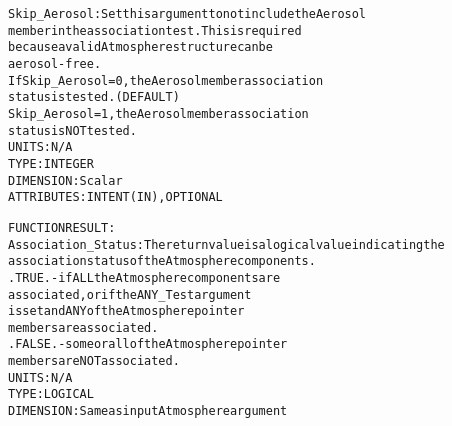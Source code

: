 \begin{alltt}
        Skip_Aerosol:        Set this argument to not include the Aerosol
                             member in the association test. This is required
                             because a valid Atmosphere structure can be
                             aerosol-free.
                             If Skip_Aerosol = 0, the Aerosol member association
                                                  status is tested.  (DEFAULT)
                                Skip_Aerosol = 1, the Aerosol member association
                                                  status is NOT tested.
                             UNITS:      N/A
                             TYPE:       INTEGER
                             DIMENSION:  Scalar
                             ATTRIBUTES: INTENT(IN), OPTIONAL
 
  FUNCTION RESULT:
        Association_Status:  The return value is a logical value indicating the
                             association status of the Atmosphere components.
                             .TRUE.  - if ALL the Atmosphere components are
                                       associated, or if the ANY_Test argument
                                       is set and ANY of the Atmosphere pointer
                                       members are associated.
                             .FALSE. - some or all of the Atmosphere pointer
                                       members are NOT associated.
                             UNITS:      N/A
                             TYPE:       LOGICAL
                             DIMENSION:  Same as input Atmosphere argument
 
  \end{alltt}
